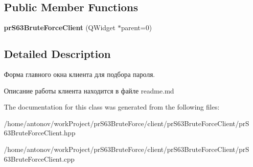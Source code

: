 \subsection*{Public Member Functions}
\begin{DoxyCompactItemize}
\item 
\mbox{\label{classclient_1_1pr_s63_brute_force_client_afa4597562e1bc7baa938d6fb29989d25}} 
{\bfseries pr\+S63\+Brute\+Force\+Client} (Q\+Widget $\ast$parent=0)
\end{DoxyCompactItemize}


\subsection{Detailed Description}
Форма главного окна клиента для подбора пароля. 

Описание работы клиента находится в файле readme.\+md 

The documentation for this class was generated from the following files\+:\begin{DoxyCompactItemize}
\item 
/home/antonov/work\+Project/pr\+S63\+Brute\+Force/client/pr\+S63\+Brute\+Force\+Client/pr\+S63\+Brute\+Force\+Client.\+hpp\item 
/home/antonov/work\+Project/pr\+S63\+Brute\+Force/client/pr\+S63\+Brute\+Force\+Client/pr\+S63\+Brute\+Force\+Client.\+cpp\end{DoxyCompactItemize}
